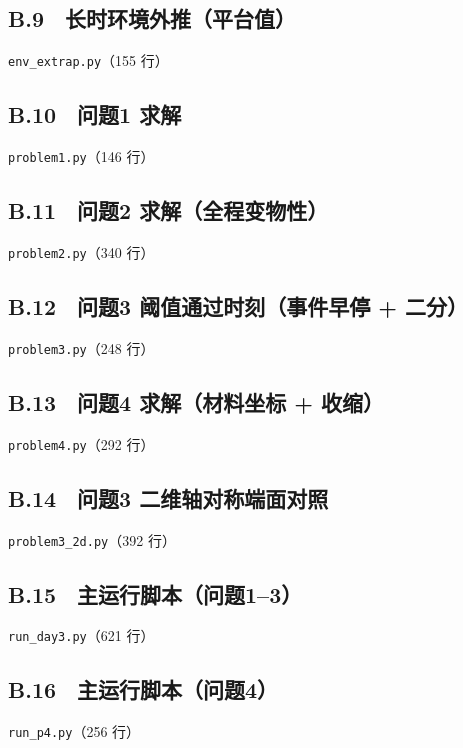 \subsection*{B.9　长时环境外推（平台值）}
\noindent\texttt{env\_extrap.py}（155 行）


\subsection*{B.10　问题1 求解}
\noindent\texttt{problem1.py}（146 行）


\subsection*{B.11　问题2 求解（全程变物性）}
\noindent\texttt{problem2.py}（340 行）


\subsection*{B.12　问题3 阈值通过时刻（事件早停 + 二分）}
\noindent\texttt{problem3.py}（248 行）


\subsection*{B.13　问题4 求解（材料坐标 + 收缩）}
\noindent\texttt{problem4.py}（292 行）


\subsection*{B.14　问题3 二维轴对称端面对照}
\noindent\texttt{problem3\_2d.py}（392 行）


\subsection*{B.15　主运行脚本（问题1--3）}
\noindent\texttt{run\_day3.py}（621 行）


\subsection*{B.16　主运行脚本（问题4）}
\noindent\texttt{run\_p4.py}（256 行）

